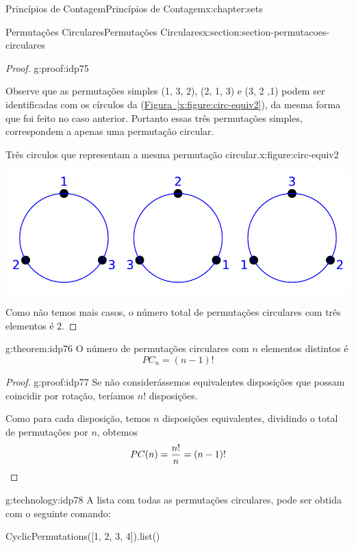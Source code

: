 \documentclass[oneside,10pt,]{book}
\newcommand{\xreffont}{\relax}
\newcommand{\qedhere}{\relax}
\numberwithin{equation}{section}
\begin{document}
\begin{chapterptx}{Princípios de Contagem}{}{Princípios de Contagem}{}{}{x:chapter:sets}
\begin{sectionptx}{Permutações Circulares}{}{Permutações Circulares}{}{}{x:section:section-permutacoes-circulares}
\begin{proof}{}{g:proof:idp75}
\par
Observe que as permutações simples (1, 3, 2), (2, 1, 3) e (3, 2 ,1) podem ser identificadas com os círculos da (\hyperref[x:figure:circ-equiv2]{Figura~{\xreffont\ref{x:figure:circ-equiv2}}}), da mesma forma que foi feito no caso anterior. Portanto essas três permutações simples, correspondem a apenas uma permutação circular.%
\begin{figureptx}{Três circulos que representam a mesma permutação circular.}{x:figure:circ-equiv2}{}%
\begin{image}{0}{1}{0}%
\includegraphics[width=\linewidth]{images/circequiv2}
\end{image}%
\tcblower
\end{figureptx}%
 Como não temos mais casos, o número total de permutações circulares com três elementos é 2.\end{proof}
\begin{theorem}{}{}{g:theorem:idp76}%
O número de permutações circulares com \(n\) elementos distintos é%
\begin{equation*}
PC_n = (n-1)! 
\end{equation*}
%
\end{theorem}
\begin{proof}{}{g:proof:idp77}
Se não considerássemos equivalentes disposições que possam coincidir por rotação, teríamos \(n!\) disposições.%
\par
Como para cada disposição, temos \(n\) disposições equivalentes, dividindo o total de permutações por \(n\), obtemos%
\begin{equation*}
PC(n) = \frac{n!}{n} = (n-1)! \qedhere
\end{equation*}
%
\end{proof}
\begin{technology}{}{g:technology:idp78}%
A lista com todas as permutações circulares, pode ser obtida com o seguinte comando: \leavevmode%
\begin{sageinput}
CyclicPermutations([1, 2, 3, 4]).list()
\end{sageinput}
\begin{sageoutput}

\end{sageoutput}
\end{technology}
\end{sectionptx}
\end{chapterptx}
\end{document}
